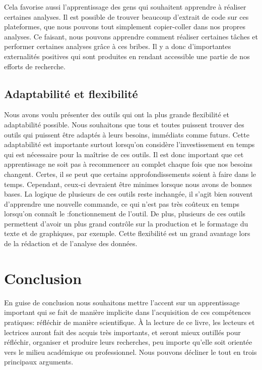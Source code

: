 \documentclass[
  letterpaper,
  DIV=11,
  numbers=noendperiod]{scrreprt}
\begin{document}
Cela favorise aussi l'apprentissage des gens qui souhaitent apprendre à
réaliser certaines analyses. Il est possible de trouver beaucoup
d'extrait de code sur ces plateformes, que nous pouvons tout simplement
copier-coller dans nos propres analyses. Ce faisant, nous pouvons
apprendre comment réaliser certaines tâches et performer certaines
analyses grâce à ces bribes. Il y a donc d'importantes externalités
positives qui sont produites en rendant accessible une partie de nos
efforts de recherche.

\hypertarget{adaptabilituxe9-et-flexibilituxe9}{%
\subsection{Adaptabilité et
flexibilité}\label{adaptabilituxe9-et-flexibilituxe9}}

Nous avons voulu présenter des outils qui ont la plus grande flexibilité
et adaptabilité possible. Nous souhaitons que tous et toutes puissent
trouver des outils qui puissent être adaptés à leurs besoins, immédiats
comme futurs. Cette adaptabilité est importante surtout lorsqu'on
considère l'investissement en temps qui est nécessaire pour la maîtrise
de ces outils. Il est donc important que cet apprentissage ne soit pas à
recommencer au complet chaque fois que nos besoins changent. Certes, il
se peut que certains approfondissements soient à faire dans le temps.
Cependant, ceux-ci devraient être minimes lorsque nous avons de bonnes
bases. La logique de plusieurs de ces outils reste inchangée, il s'agit
bien souvent d'apprendre une nouvelle commande, ce qui n'est pas très
coûteux en temps lorsqu'on connaît le :fonctionnement de l'outil. De
plus, plusieurs de ces outils permettent d'avoir un plus grand contrôle
sur la production et le formatage du texte et de graphiques, par
exemple. Cette flexibilité est un grand avantage lors de la rédaction et
de l'analyse des données.

\hypertarget{conclusion}{%
\section{Conclusion}\label{conclusion}}

En guise de conclusion nous souhaitons mettre l'accent sur un
apprentissage important qui se fait de manière implicite dans
l'acquisition de ces compétences pratiques: réfléchir de manière
scientifique. À la lecture de ce livre, les lecteurs et lectrices auront
fait des acquis très importants, et seront mieux outillés pour
réfléchir, organiser et produire leurs recherches, peu importe qu'elle
soit orientée vers le milieu académique ou professionnel. Nous pouvons
décliner le tout en trois principaux arguments.
\end{document}

